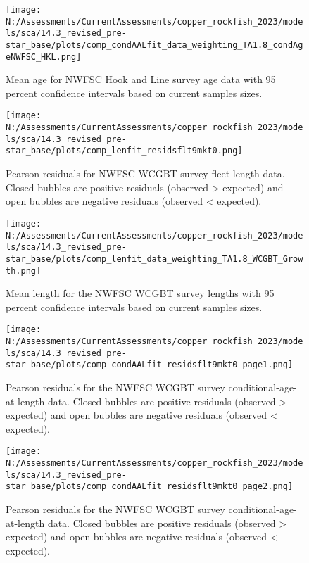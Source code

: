 \documentclass[11pt,
  english,
  letterpaper,
]{article}
\begin{document}
\pagebreak

\begin{figure}
\centering
\texttt{[image: N:/Assessments/CurrentAssessments/copper\_rockfish\_2023/models/sca/14.3\_revised\_pre-star\_base/plots/comp\_condAALfit\_data\_weighting\_TA1.8\_condAgeNWFSC\_HKL.png]}
\caption{Mean age for NWFSC Hook and Line survey age data with 95 percent confidence intervals based on current samples sizes.\label{fig:nwfsc-hkl-mean-age-fit}}
\end{figure}

\pagebreak

\begin{figure}
\centering
\texttt{[image: N:/Assessments/CurrentAssessments/copper\_rockfish\_2023/models/sca/14.3\_revised\_pre-star\_base/plots/comp\_lenfit\_residsflt9mkt0.png]}
\caption{Pearson residuals for NWFSC WCGBT survey fleet length data. Closed bubbles are positive residuals (observed \textgreater{} expected) and open bubbles are negative residuals (observed \textless{} expected).\label{fig:wcgbt-len-pearson}}
\end{figure}

\pagebreak

\begin{figure}
\centering
\texttt{[image: N:/Assessments/CurrentAssessments/copper\_rockfish\_2023/models/sca/14.3\_revised\_pre-star\_base/plots/comp\_lenfit\_data\_weighting\_TA1.8\_WCGBT\_Growth.png]}
\caption{Mean length for the NWFSC WCGBT survey lengths with 95 percent confidence intervals based on current samples sizes.\label{fig:wcgbt-mean-len-fit}}
\end{figure}

\pagebreak

\begin{figure}
\centering
\texttt{[image: N:/Assessments/CurrentAssessments/copper\_rockfish\_2023/models/sca/14.3\_revised\_pre-star\_base/plots/comp\_condAALfit\_residsflt9mkt0\_page1.png]}
\caption{Pearson residuals for the NWFSC WCGBT survey conditional-age-at-length data. Closed bubbles are positive residuals (observed \textgreater{} expected) and open bubbles are negative residuals (observed \textless{} expected).\label{fig:wcgbt-age-pearson-1}}
\end{figure}

\pagebreak

\begin{figure}
\centering
\texttt{[image: N:/Assessments/CurrentAssessments/copper\_rockfish\_2023/models/sca/14.3\_revised\_pre-star\_base/plots/comp\_condAALfit\_residsflt9mkt0\_page2.png]}
\caption{Pearson residuals for the NWFSC WCGBT survey conditional-age-at-length data. Closed bubbles are positive residuals (observed \textgreater{} expected) and open bubbles are negative residuals (observed \textless{} expected).\label{fig:wcgbt-age-pearson-2}}
\end{figure}
\end{document}
